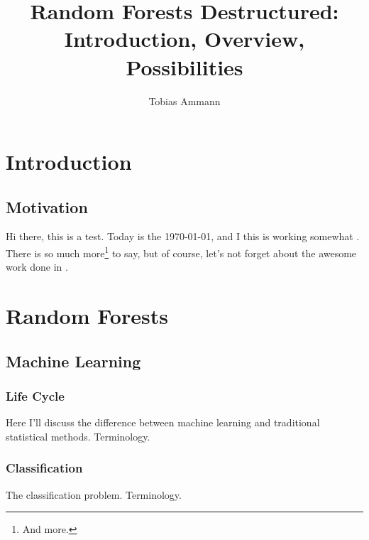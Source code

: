 \documentclass[a4paper,man,12pt,apacite]{apa6} %
\begin{document}
\title{Random Forests Destructured: Introduction, Overview, Possibilities}
\author{Tobias Ammann}


\maketitle

\tableofcontents

\section{Introduction}

\subsection{Motivation}
Hi there, this is a test. Today is the \today, and I this is working
somewhat \cite{liu2005maximizing}. There is so much more\footnote{And more.}
to say, but of course, let's not forget about the awesome work done
in \cite{cutler2001pert}.

\section{Random Forests}

\subsection{Machine Learning}

\subsubsection{Life Cycle}
Here I'll discuss the difference between machine learning and traditional
statistical methods. Terminology.

\subsubsection{Classification}
The classification problem. Terminology.
\end{document}

